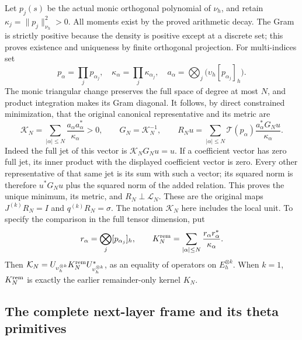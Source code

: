 Let \(p_j(s)\) be the actual monic orthogonal polynomial of
\(\nu_h\), and retain \(\kappa_j=\|p_j\|_{\nu_h}^2>0\).
All moments exist by the proved arithmetic decay.  The Gram is
strictly positive because the density is positive except at a
discrete set; this proves existence and uniqueness by finite
orthogonal projection.  For multi-indices set
\[
 p_\alpha=\prod_jp_{\alpha_j},\quad
 \kappa_\alpha=\prod_j\kappa_{\alpha_j},\quad
 a_\alpha=\bigotimes_j\bigl(\upsilon_h[p_{\alpha_j}]_h\bigr).
                                                               \tag{KL.5}
\]
The monic triangular change preserves the full space of degree at
most \(N\), and product integration makes its Gram diagonal.
It follows, by direct constrained minimization, that the original
canonical representative and its metric are
\[
 \mathcal K_N=\sum_{|\alpha|\leq N}
                 \frac{a_\alpha a_\alpha^*}{\kappa_\alpha}>0,
 \qquad G_N=\mathcal K_N^{-1},
 \qquad
 R_Nu=\sum_{|\alpha|\leq N}\mathcal T(p_\alpha)
                 \frac{a_\alpha^*G_Nu}{\kappa_\alpha}.
                                                               \tag{KL.6}
\]
Indeed the full jet of this vector is \(\mathcal K_NG_Nu=u\).
If a coefficient vector has zero full jet, its inner product with
the displayed coefficient vector is zero.  Every other representative
of that same jet is its sum with such a vector; its squared norm is
therefore \(u^*G_Nu\) plus the squared norm of the added relation.
This proves the unique minimum, its metric, and
\(R_N\perp\mathcal L_N\).  These are the original maps
\(J^{(k)}R_N=I\) and \(q^{(k)}R_N=\sigma\).
The notation \(\mathcal K_N\) here includes the local unit.
To specify the comparison in the full tensor dimension, put
\[
 r_\alpha=\bigotimes_j[p_{\alpha_j}]_h,\qquad
 K_N^{\rm rem}=\sum_{|\alpha|\leq N}
             \frac{r_\alpha r_\alpha^*}{\kappa_\alpha}.
\]
Then \(\mathcal K_N=U_{\upsilon_h^{\otimes k}}K_N^{\rm rem}
U_{\upsilon_h^{\otimes k}}^*\), as an equality of operators on
\(E_h^{\otimes k}\).  When \(k=1\), \(K_N^{\rm rem}\) is
exactly the earlier remainder-only kernel \(K_N\).

\subsection{The complete next-layer frame and its theta primitives}

